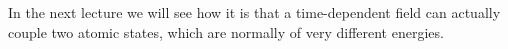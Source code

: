 In the next lecture we will see how it is that a time-dependent field can actually couple two atomic states, which are normally of very different energies.